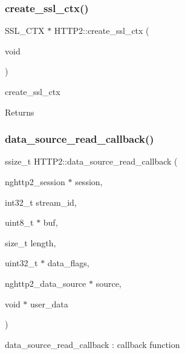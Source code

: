 \subsubsection{\texorpdfstring{create\+\_\+ssl\+\_\+ctx()}{create\_ssl\_ctx()}}
{\footnotesize\ttfamily S\+S\+L\+\_\+\+C\+TX $\ast$ H\+T\+T\+P2\+::create\+\_\+ssl\+\_\+ctx (\begin{DoxyParamCaption}\item[{void}]{ }\end{DoxyParamCaption})\hspace{0.3cm}{\ttfamily [static]}}



create\+\_\+ssl\+\_\+ctx 

\begin{DoxyReturn}{Returns}

\end{DoxyReturn}
\mbox{\label{classhttp2_1_1HTTP2_afac95e869b75940504c56e8d37f72695}} 
\subsubsection{\texorpdfstring{data\+\_\+source\+\_\+read\+\_\+callback()}{data\_source\_read\_callback()}}
{\footnotesize\ttfamily ssize\+\_\+t H\+T\+T\+P2\+::data\+\_\+source\+\_\+read\+\_\+callback (\begin{DoxyParamCaption}\item[{nghttp2\+\_\+session $\ast$}]{session,  }\item[{int32\+\_\+t}]{stream\+\_\+id,  }\item[{uint8\+\_\+t $\ast$}]{buf,  }\item[{size\+\_\+t}]{length,  }\item[{uint32\+\_\+t $\ast$}]{data\+\_\+flags,  }\item[{nghttp2\+\_\+data\+\_\+source $\ast$}]{source,  }\item[{void $\ast$}]{user\+\_\+data }\end{DoxyParamCaption})\hspace{0.3cm}{\ttfamily [static]}}



data\+\_\+source\+\_\+read\+\_\+callback \+: callback function 

